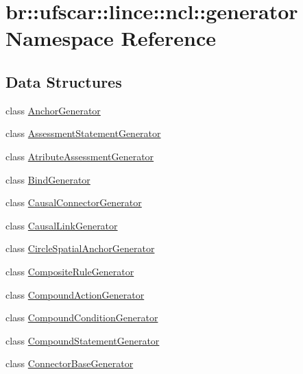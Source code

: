 \hypertarget{namespacebr_1_1ufscar_1_1lince_1_1ncl_1_1generator}{
\section{br::ufscar::lince::ncl::generator Namespace Reference}
\label{namespacebr_1_1ufscar_1_1lince_1_1ncl_1_1generator}
}
\subsection*{Data Structures}
\begin{DoxyCompactItemize}
\item 
class \hyperlink{classbr_1_1ufscar_1_1lince_1_1ncl_1_1generator_1_1AnchorGenerator}{AnchorGenerator}
\item 
class \hyperlink{classbr_1_1ufscar_1_1lince_1_1ncl_1_1generator_1_1AssessmentStatementGenerator}{AssessmentStatementGenerator}
\item 
class \hyperlink{classbr_1_1ufscar_1_1lince_1_1ncl_1_1generator_1_1AtributeAssessmentGenerator}{AtributeAssessmentGenerator}
\item 
class \hyperlink{classbr_1_1ufscar_1_1lince_1_1ncl_1_1generator_1_1BindGenerator}{BindGenerator}
\item 
class \hyperlink{classbr_1_1ufscar_1_1lince_1_1ncl_1_1generator_1_1CausalConnectorGenerator}{CausalConnectorGenerator}
\item 
class \hyperlink{classbr_1_1ufscar_1_1lince_1_1ncl_1_1generator_1_1CausalLinkGenerator}{CausalLinkGenerator}
\item 
class \hyperlink{classbr_1_1ufscar_1_1lince_1_1ncl_1_1generator_1_1CircleSpatialAnchorGenerator}{CircleSpatialAnchorGenerator}
\item 
class \hyperlink{classbr_1_1ufscar_1_1lince_1_1ncl_1_1generator_1_1CompositeRuleGenerator}{CompositeRuleGenerator}
\item 
class \hyperlink{classbr_1_1ufscar_1_1lince_1_1ncl_1_1generator_1_1CompoundActionGenerator}{CompoundActionGenerator}
\item 
class \hyperlink{classbr_1_1ufscar_1_1lince_1_1ncl_1_1generator_1_1CompoundConditionGenerator}{CompoundConditionGenerator}
\item 
class \hyperlink{classbr_1_1ufscar_1_1lince_1_1ncl_1_1generator_1_1CompoundStatementGenerator}{CompoundStatementGenerator}
\item 
class \hyperlink{classbr_1_1ufscar_1_1lince_1_1ncl_1_1generator_1_1ConnectorBaseGenerator}{ConnectorBaseGenerator}

\end{DoxyCompactItemize}
